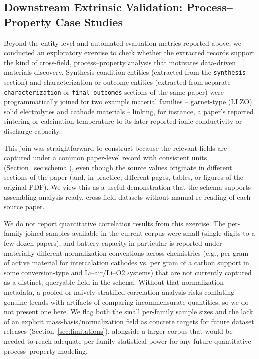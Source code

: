 \documentclass[12pt,a4paper]{article}
\begin{document}
\subsection{Downstream Extrinsic Validation: Process--Property Case Studies}
\label{sec:downstream}

Beyond the entity-level and automated evaluation metrics reported above, we conducted an exploratory exercise to check whether the extracted records support the kind of cross-field, process--property analysis that motivates data-driven materials discovery. Synthesis-condition entities (extracted from the \texttt{synthesis} section) and characterization or outcome entities (extracted from separate \texttt{characterization} or \texttt{final\_outcomes} sections of the same paper) were programmatically joined for two example material families -- garnet-type (LLZO) solid electrolytes and cathode materials -- linking, for instance, a paper's reported sintering or calcination temperature to its later-reported ionic conductivity or discharge capacity.

This join was straightforward to construct because the relevant fields are captured under a common paper-level record with consistent units (Section~\ref{sec:schema}), even though the source values originate in different sections of the paper (and, in practice, different pages, tables, or figures of the original PDF). We view this as a useful demonstration that the schema supports assembling analysis-ready, cross-field datasets without manual re-reading of each source paper.

We do not report quantitative correlation results from this exercise. The per-family joined samples available in the current corpus were small (single digits to a few dozen papers), and battery capacity in particular is reported under materially different normalization conventions across chemistries (e.g., per gram of active material for intercalation cathodes vs. per gram of a carbon support in some conversion-type and Li--air/Li--O2 systems) that are not currently captured as a distinct, queryable field in the schema. Without that normalization metadata, a pooled or naively stratified correlation analysis risks conflating genuine trends with artifacts of comparing incommensurate quantities, so we do not present one here. We flag both the small per-family sample sizes and the lack of an explicit mass-basis/normalization field as concrete targets for future dataset releases (Section~\ref{sec:limitations}), alongside a larger corpus that would be needed to reach adequate per-family statistical power for any future quantitative process--property modeling.
\end{document}
